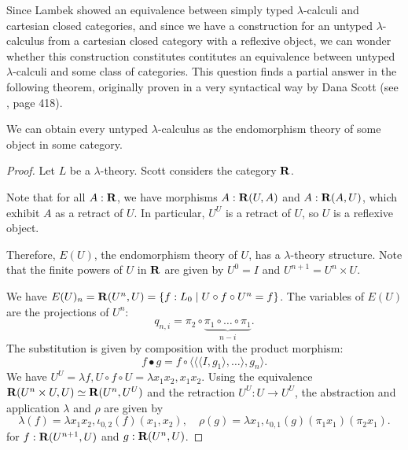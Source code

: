 Since Lambek showed an equivalence between simply typed $ \lambda $-calculi and cartesian closed categories, and since we have a construction for an untyped $ \lambda $-calculus from a cartesian closed category with a reflexive object, we can wonder whether this construction constitutes contitutes an equivalence between untyped $ \lambda $-calculi and some class of categories. This question finds a partial answer in the following theorem, originally proven in a very syntactical way by Dana Scott (see \cite{curry}, page 418).
\begin{theorem}
  We can obtain every untyped $ \lambda $-calculus as the endomorphism theory of some object in some category.
\end{theorem}
\begin{proof}
  Let $ L $ be a $ \lambda $-theory. Scott considers the category $ \mathbf{R} $.

  Note that for all $ A: \mathbf{R} $, we have morphisms $ A: \mathbf{R}(U, A) $ and $ A: \mathbf{R}(A, U) $, which exhibit $ A $ as a retract of $ U $. In particular, $ U^U $ is a retract of $ U $, so $ U $ is a reflexive object.

  Therefore, $ E(U) $, the endomorphism theory of $ U $, has a $ \lambda $-theory structure. Note that the finite powers of $ U $ in $ \mathbf{R} $ are given by $ U^0 = I $ and $ U^{n + 1} = U^n \times U $.

  We have $ E(U)_n = \mathbf{R}(U^n, U) = \{ f: L_0 \mid U \circ f \circ U^n = f \} $. The variables of $ E(U) $ are the projections of $ U^n $:
  \[ q_{n, i} = \pi_2 \circ \underbrace{\pi_1 \circ \dots \circ \pi_1}_{n - i}. \]
  The substitution is given by composition with the product morphism:
  \[ f \bullet g = f \circ \langle \langle \langle I, g_1 \rangle, \dots \rangle, g_n \rangle. \]
  We have $ U^U = \lambda f, U \circ f \circ U = \lambda x_1 x_2, x_1 x_2 $. Using the equivalence $ \mathbf{R}(U^n \times U, U) \simeq \mathbf{R}(U^n, U^U) $ and the retraction $ U^U: U \to U^U $, the abstraction and application $ \lambda $ and $ \rho $ are given by
  \[ \lambda(f) = \lambda x_1 x_2, \iota_{0, 2}(f)(x_1, x_2), \quad \rho(g) = \lambda x_1, \iota_{0, 1}(g) (\pi_1 x_1) (\pi_2 x_1). \]
  for $ f: \mathbf{R}(U^{n + 1}, U) $ and $ g: \mathbf{R}(U^n, U) $.


\end{proof}
